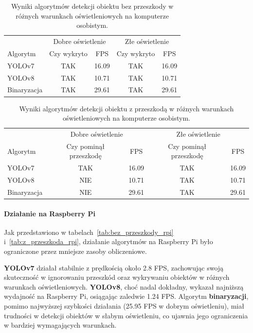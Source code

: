 \documentclass[a4paper,twoside,12pt]{book}
\begin{document}
\begin{table}[h!]
    \centering
    \caption{Wyniki algorytmów detekcji obiektu bez przeszkody w różnych warunkach oświetleniowych na komputerze osobistym.}
    \label{tab:bez_przeszkody}
    \begin{tabular}{lcccc}
    \toprule
     & \multicolumn{2}{c}{Dobre oświetlenie} & \multicolumn{2}{c}{Złe oświetlenie} \\
    \cmidrule(r){2-3} \cmidrule(r){4-5}
    Algorytm & Czy wykryto & FPS & Czy wykryto & FPS \\
    \midrule
    YOLOv7 & TAK & 16.09 & TAK & 16.09 \\
    YOLOv8 & TAK & 10.71 & TAK & 10.71 \\
    Binaryzacja & TAK & 29.61 & TAK & 29.61 \\
    \bottomrule
    \end{tabular}
\end{table}

\begin{table}[h!]
    \centering
    \caption{Wyniki algorytmów detekcji obiektu z przeszkodą w różnych warunkach oświetleniowych na komputerze osobistym.}
    \label{tab:z_przeszkoda}
    \begin{tabular}{lcccc}
    \toprule
     & \multicolumn{2}{c}{Dobre oświetlenie} & \multicolumn{2}{c}{Złe oświetlenie} \\
    \cmidrule(r){2-3} \cmidrule(r){4-5}
    Algorytm & Czy pominął przeszkodę & FPS & Czy pominął przeszkodę & FPS \\
    \midrule
    YOLOv7 & TAK & 16.09 & TAK & 16.09 \\
    YOLOv8 & NIE & 10.71 & TAK & 10.71 \\
    Binaryzacja & NIE & 29.61 & TAK & 29.61 \\
    \bottomrule
    \end{tabular}
\end{table}

\newpage

\paragraph{Działanie na Raspberry Pi}
Jak przedstawiono w tabelach~\ref{tab:bez_przeszkody_rpi} i~\ref{tab:z_przeszkoda_rpi}, działanie algorytmów na Raspberry Pi było ograniczone przez mniejsze zasoby obliczeniowe. 

\textbf{YOLOv7} działał stabilnie z prędkością około 2.8 FPS, zachowując swoją skuteczność w ignorowaniu przeszkód oraz wykrywaniu obiektów w różnych warunkach oświetleniowych. \textbf{YOLOv8}, choć nadal dokładny, wykazał najniższą wydajność na Raspberry Pi, osiągając zaledwie 1.24 FPS. Algorytm \textbf{binaryzacji}, pomimo najwyższej szybkości działania (25.95 FPS w dobrym oświetleniu), miał trudności w detekcji obiektów w słabym oświetleniu, co ujawnia jego ograniczenia w bardziej wymagających warunkach.
\end{document}
